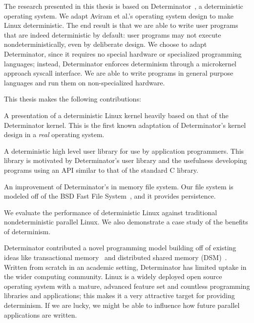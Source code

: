 The research presented in this thesis is based on Determinator~\cite{Aviram10},
a deterministic operating system. We adapt Aviram et al.'s operating system
design to make Linux deterministic. The end result is that we are able to write
user programs that are indeed deterministic by default: user programs may not
execute nondeterministically, even by deliberate design. We choose to adapt
Determinator, since it requires no special hardware or specialized programming
languages; instead, Determinator enforces determinism through a microkernel
approach syscall interface. We are able to write programs in general purpose
languages and run them on non-specialized hardware.

This thesis makes the following contributions:

\begin{myitemize}
    \item A presentation of a deterministic Linux kernel heavily based on that
    of the Determinator kernel. This is the first known adaptation of
    Determinator's kernel design in a \emph{real} operating system.
    \item A deterministic high level user library for use by application
    programmers. This library is motivated by Determinator's user library and
    the usefulness developing programs using an API similar to that of the
    standard C library.
    \item An improvement of Determinator's in memory file system. Our file
    system is modeled off of the BSD Fast File System~\cite{mckusick1984fast},
    and it provides persistence.
    \item We evaluate the performance of deterministic Linux against traditional
    nondeterministic parallel Linux. We also demonstrate a case study of the
    benefits of determinism.
\end{myitemize}

\iffalse
This thesis also presents an accompanying
user level C library, akin to the library utilities discussed by Aviram et al.
This user library is intended to simplify writing user programs in C using
familiar high level abstractions such as fork-join. We also provide an in memory
file system, improving upon Arivam et al.'s in memory file system design.
\fi

Determinator contributed a novel programming model building off of existing
ideas like transactional memory~\cite{herlihy1993transactional} and distributed
shared memory (DSM)~\cite{amza1996treadmarks}. Written from scratch in an
academic setting, Determinator has limited uptake in the wider computing
community. Linux is a widely deployed open source operating system with a
mature, advanced feature set and countless programming libraries and
applications; this makes it a very attractive target for providing determinism.
If we are lucky, we might be able to influence how future parallel applications
are written.


